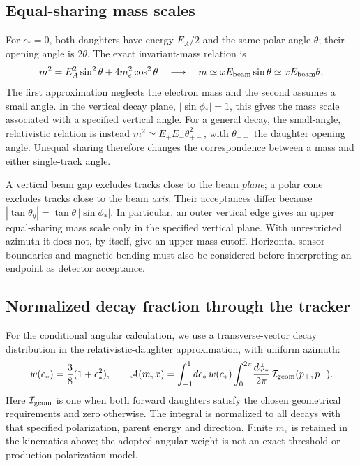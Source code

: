 \subsection{Equal-sharing mass scales}
\label{v571:equal-sharing}
For $c_*=0$, both daughters have energy $E_A/2$ and the same polar angle
$\theta$; their opening angle is $2\theta$.  The exact invariant-mass relation is
\begin{equation}
  m^2=E_A^2\sin^2\theta+4m_e^2\cos^2\theta
  \quad\longrightarrow\quad
  m\simeq xE_{\rm beam}\sin\theta
  \simeq xE_{\rm beam}\theta .
  \label{v571:equal-sharing-mass}
\end{equation}
The first approximation neglects the electron mass and the second assumes a
small angle.  In the vertical decay plane, $|\sin\phi_*|=1$, this gives the
mass scale associated with a specified vertical angle.  For a general decay,
the small-angle, relativistic relation is instead
$m^2\simeq E_+E_-\theta_{+-}^2$, with
$\theta_{+-}$ the daughter opening angle.  Unequal sharing therefore changes
the correspondence between a mass and either single-track angle.

A vertical beam gap excludes tracks close to the beam \emph{plane}; a polar
cone excludes tracks close to the beam \emph{axis}.  Their acceptances differ
because $|\tan\theta_y|=\tan\theta\,|\sin\phi_*|$.  In particular, an outer
vertical edge gives an upper equal-sharing mass scale only in the specified
vertical plane.  With unrestricted azimuth it does not, by itself, give an
upper mass cutoff.  Horizontal sensor boundaries and magnetic bending must
also be considered before interpreting an endpoint as detector acceptance.

\subsection{Normalized decay fraction through the tracker}
\label{v571:acceptance}
For the conditional angular calculation, we use a transverse-vector decay
distribution in the relativistic-daughter approximation, with uniform
azimuth:
\begin{equation}
  w(c_*)=\frac38(1+c_*^2),\qquad
  \mathcal A(m,x)=\int_{-1}^{1}\!dc_*\,w(c_*)
    \int_0^{2\pi}\!\frac{d\phi_*}{2\pi}\,
    \mathcal I_{\rm geom}(p_+,p_-).
  \label{v571:acceptance-integral}
\end{equation}
Here $\mathcal I_{\rm geom}$ is one when both forward daughters satisfy the
chosen geometrical requirements and zero otherwise.  The integral is
normalized to all decays with that specified polarization, parent energy and
direction.  Finite $m_e$ is retained in the kinematics above; the adopted
angular weight is not an exact threshold or production-polarization model.

